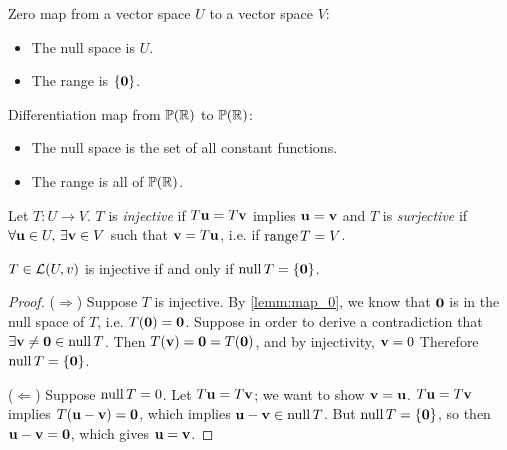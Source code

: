 \documentclass{article}
\begin{document}
\begin{example}
Zero map from a vector space $U$ to a vector space $V$:
\begin{itemize}
    \item The null space is $U$.
    \item The range is $\{{\mathbf{0}}\}$.
\end{itemize}
Differentiation map from $\mathbb{P}({\mathbb{R}})$ to $\mathbb{P}({\mathbb{R}})$:
\begin{itemize}
    \item The null space is the set of all constant functions.
    \item The range is all of $\mathbb{P}({\mathbb{R}})$.
\end{itemize}
\end{example}

\begin{definition}
Let $T:U \to V$. $T$ is \emph{injective} if $T{\mathbf{u}} = T{\mathbf{v}}$ implies ${\mathbf{u}} = {\mathbf{v}}$ and $T$ is \emph{surjective} if $\forall {\mathbf{u}} \in U, \, \exists {\mathbf{v}} \in V$ such that ${\mathbf{v}} = T{\mathbf{u}}$, i.e. if $\operatorname{range} T = V$.
\end{definition}

\begin{theorem}
$T \in {\mathcal{L}}(U,v)$ is injective if and only if $\operatorname{null} T = \{ {\mathbf{0}} \}$.
\end{theorem}
\begin{proof}
($\Rightarrow$) Suppose $T$ is injective. By \cref{lemm:map_0}, we know that ${\mathbf{0}}$ is in the null space of $T$, i.e. $T({\mathbf{0}}) = {\mathbf{0}}$. Suppose in order to derive a contradiction that $\exists {\mathbf{v}} \neq {\mathbf{0}} \in \operatorname{null} T$. Then $T({\mathbf{v}}) = {\mathbf{0}} = T({\mathbf{0}})$, and by injectivity, ${\mathbf{v}} = 0$ Therefore $\operatorname{null} T = \{{\mathbf{0}}\}$. 

($\Leftarrow$) Suppose $\operatorname{null} T = 0$. Let $T{\mathbf{u}} = T{\mathbf{v}}$; we want to show ${\mathbf{v}} = {\mathbf{u}}$. $T{\mathbf{u}} = T{\mathbf{v}}$ implies $T ({\mathbf{u}} - {\mathbf{v}}) = {\mathbf{0}}$, which implies ${\mathbf{u}} - {\mathbf{v}} \in \operatorname{null} T$. But $\operatorname{null} T = \{{\mathbf{0}}\}$, so then ${\mathbf{u}} - {\mathbf{v}} = {\mathbf{0}}$, which gives ${\mathbf{u}}={\mathbf{v}}$.
\end{proof}

\end{document}
